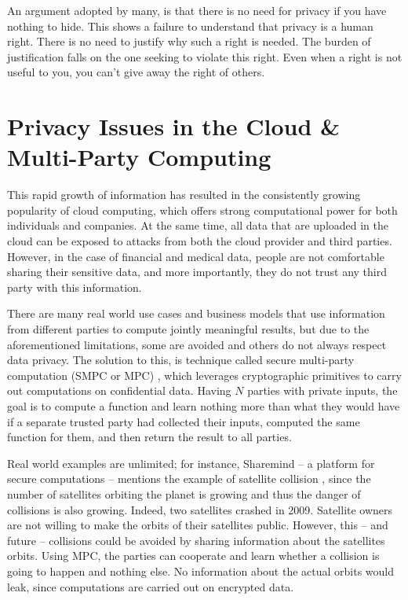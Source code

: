 An argument adopted by many, is that there is no need for privacy if you have nothing to hide.
This shows a failure to understand that privacy is a human right.
There is no need to justify why such a right is needed.
The burden of justification falls on the one seeking to violate this right.
Even when a right is not useful to you, you can't give away the right of others.


\section{Privacy Issues in the Cloud \& Multi-Party Computing}\label{s:privacy-cloud-multiparty}

This rapid growth of information has resulted in the consistently growing popularity of cloud computing, which offers strong computational power for both individuals and companies.
At the same time, all data that are uploaded in the cloud can be exposed to attacks from both the cloud provider and third parties.
However, in the case of financial and medical data, people are not comfortable sharing their sensitive data, and more importantly, they do not trust any third party with this information.

There are many real world use cases and business models that use information from different parties to compute jointly meaningful results, but due to the aforementioned limitations, some are avoided and others do not always respect data privacy.
The solution to this, is technique called secure multi-party computation (SMPC or MPC) \cite{yao1982protocols, goldreich1998secure}, which leverages cryptographic primitives to carry out computations on confidential data.
Having $N$ parties with private inputs, the goal is to compute a function and learn nothing more than what they would have if a separate trusted party had collected their inputs, computed the same function for them, and then return the result to all parties.

Real world examples are unlimited; for instance, Sharemind \cite{bogdanov2008sharemind} -- a platform for secure computations -- mentions the example of satellite collision \cite{kamm2015secure}, since the number of satellites orbiting the planet is growing and thus the danger of collisions is also growing.
Indeed, two satellites crashed in 2009.
Satellite owners are not willing to make the orbits of their satellites public.
However, this -- and future -- collisions could be avoided by sharing information about the satellites orbits.
Using MPC, the parties can cooperate and learn whether a collision is going to happen and nothing else.
No information about the actual orbits would leak, since computations are carried out on encrypted data.


